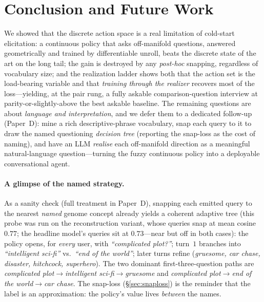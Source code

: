 \documentclass[11pt]{article}
\begin{document}
\section{Conclusion and Future Work}\label{sec:future}
We showed that the discrete action space is a real limitation of cold-start elicitation: a continuous policy that asks
off-manifold questions, answered geometrically and trained by differentiable unroll, beats the discrete state of the art
on the long tail; the gain is destroyed by any \emph{post-hoc} snapping, regardless of vocabulary size; and the
realization ladder shows both that the action set is the load-bearing variable and that \emph{training through the
realizer} recovers most of the loss---yielding, at the pair rung, a fully askable comparison-question interview at
parity-or-slightly-above the best askable baseline. The remaining questions are about \emph{language and
interpretation}, and we defer them to a dedicated follow-up (Paper~D): mine a rich descriptive-phrase vocabulary, snap
each query to it to draw the named questioning \emph{decision tree} (reporting the snap-loss as the cost of naming), and
have an LLM \emph{realise} each off-manifold direction as a meaningful natural-language question---turning the fuzzy
continuous policy into a deployable conversational agent.

\paragraph{A glimpse of the named strategy.} As a sanity check (full treatment in Paper~D), snapping each emitted query
to the nearest \emph{named} genome concept already yields a coherent adaptive tree (this probe was run on the
reconstruction variant, whose queries snap at mean cosine $0.77$; the headline model's queries sit at $0.73$---near but
off in both cases):
the policy opens, for \emph{every} user, with \emph{``complicated plot?''}; turn~$1$ branches into \emph{``intelligent
sci-fi''} vs.\ \emph{``end of the world''}; later turns refine (\emph{gruesome, car chase, disaster, hitchcock,
superhero}). The two dominant first-three-question paths are
\emph{complicated plot}$\to$\emph{intelligent sci-fi}$\to$\emph{gruesome} and
\emph{complicated plot}$\to$\emph{end of the world}$\to$\emph{car chase}. The snap-loss (\S\ref{sec:snaploss}) is the
reminder that the label is an approximation: the policy's value lives \emph{between} the names.
\end{document}
